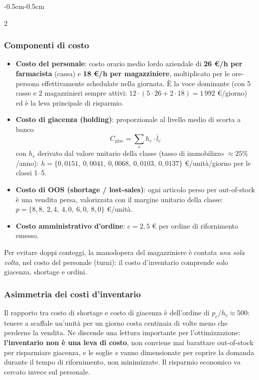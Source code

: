 \documentclass{article}
\begin{document}
\begin{adjustwidth}{-0.5cm}{-0.5cm}
\begin{multicols}{2}
\subsubsection*{Componenti di costo}
\begin{itemize}
    \item \textbf{Costo del personale}: costo orario medio lordo aziendale di
    \textbf{26 \euro/h per farmacista} (cassa) e \textbf{18 \euro/h per magazziniere},
    moltiplicato per le ore-persona effettivamente schedulate nella giornata. È la voce dominante
    (con 5 casse e 2 magazzinieri sempre attivi: $12\cdot(5\cdot26+2\cdot18) = 1\,992$
    \euro/giorno) ed è la leva principale di risparmio.
    \item \textbf{Costo di giacenza (holding)}: proporzionale al livello medio di scorta a banco
    \[C_{\text{giac}} = \sum_c h_c \cdot \bar{l}_c\]con $h_c$ derivato dal valore unitario della
    classe (tasso di immobilizzo $\approx 25\%$/anno): $h = \{0{,}0151,\ 0{,}0041,\ 0{,}0068,\
    0{,}0103,\ 0{,}0137\}$ \euro/unità/giorno per le classi 1--5.
    \item \textbf{Costo di OOS (shortage / lost-sales)}: ogni articolo perso per out-of-stock
    è una vendita persa, valorizzata con il margine unitario della classe:
    $p = \{8{,}8,\ 2{,}4,\ 4{,}0,\ 6{,}0,\ 8{,}0\}$ \euro/unità.
    \item \textbf{Costo amministrativo d'ordine}: $c = 2{,}5$ \euro{} per ordine di rifornimento
    emesso.
\end{itemize}
Per evitare doppi conteggi, la manodopera del magazziniere è contata \emph{una sola volta}, nel
costo del personale (turni): il costo d'inventario comprende solo giacenza, shortage e ordini.

\subsubsection*{Asimmetria dei costi d'inventario}
Il rapporto tra costo di shortage e costo di giacenza è dell'ordine di $p_c/h_c \approx 500$:
tenere a scaffale un'unità per un giorno costa centinaia di volte meno che perderne la vendita.
Ne discende una lettura importante per l'ottimizzazione: \textbf{l'inventario non è una leva di
costo},  non conviene mai barattare out-of-stock per risparmiare giacenza, e le
soglie $s$ vanno dimensionate per coprire la domanda durante il tempo di rifornimento, non
minimizzate. Il risparmio economico va cercato invece sul personale.


\end{multicols}
\end{adjustwidth}
\end{document}
